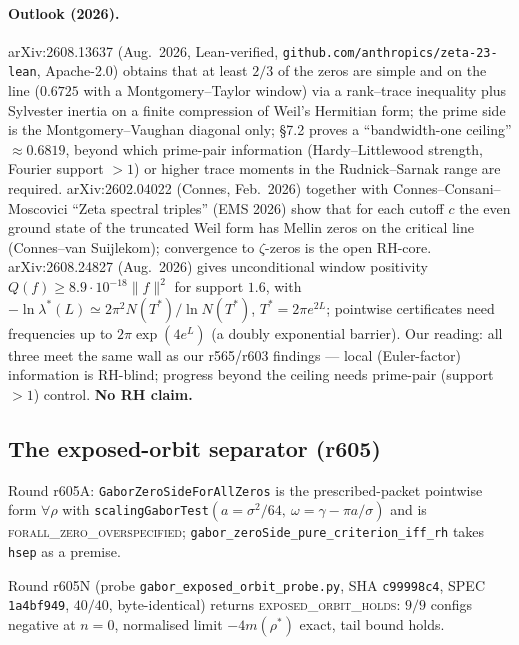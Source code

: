 \documentclass[11pt]{article}
\theoremstyle{definition}
\theoremstyle{remark}
\begin{document}
\paragraph{Outlook (2026).}
arXiv:2608.13637 (Aug.~2026, Lean-verified,
\texttt{github.com/anthropics/zeta-23-lean}, Apache-2.0) obtains that at
least $2/3$ of the zeros are simple and on the line ($0.6725$ with a
Montgomery--Taylor window) via a rank--trace inequality plus Sylvester
inertia on a finite compression of Weil's Hermitian form; the prime side
is the Montgomery--Vaughan diagonal only; \S7.2 proves a
``bandwidth-one ceiling'' $\approx 0.6819$, beyond which prime-pair
information (Hardy--Littlewood strength, Fourier support $>1$) or higher
trace moments in the Rudnick--Sarnak range are required.
arXiv:2602.04022 (Connes, Feb.~2026) together with Connes--Consani--Moscovici
``Zeta spectral triples'' (EMS 2026) show that for each cutoff $c$ the
even ground state of the truncated Weil form has Mellin zeros on the
critical line (Connes--van Suijlekom); convergence to $\zeta$-zeros is
the open RH-core.
arXiv:2608.24827 (Aug.~2026) gives unconditional window positivity
$Q(f)\ge 8.9\cdot 10^{-18}\|f\|^2$ for support $1.6$, with
$-\ln\lambda^*(L)\simeq 2\pi^2 N(T^*)/\ln N(T^*)$,
$T^*=2\pi e^{2L}$; pointwise certificates need frequencies up to
$2\pi\exp(4e^L)$ (a doubly exponential barrier).
Our reading: all three meet the same wall as our r565/r603 findings ---
local (Euler-factor) information is RH-blind; progress beyond the ceiling
needs prime-pair (support $>1$) control.
\textbf{No RH claim.}

\subsection{The exposed-orbit separator (r605)}\label{sec:exposed-orbit}

Round r605A: \texttt{GaborZeroSideForAllZeros} is the prescribed-packet
pointwise form $\forall\rho$ with
\texttt{scalingGaborTest}$(a=\sigma^2/64,\ \omega=\gamma-\pi a/\sigma)$
and is \textsc{forall\_zero\_overspecified};
\texttt{gabor\_zeroSide\_pure\_criterion\_iff\_rh} takes \texttt{hsep}
as a premise.

Round r605N (probe \texttt{gabor\_exposed\_orbit\_probe.py},
SHA \texttt{c99998c4}, SPEC \texttt{1a4bf949}, $40/40$, byte-identical)
returns \textsc{exposed\_orbit\_holds}: $9/9$ configs negative at $n=0$,
normalised limit $-4m(\rho^*)$ exact, tail bound holds.
\end{document}
